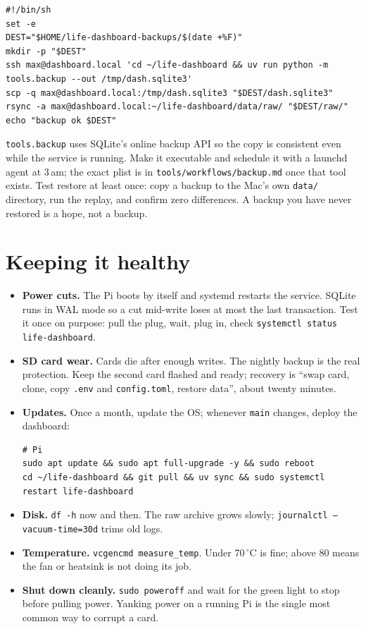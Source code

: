 \documentclass[11pt,letterpaper]{article}
\newcommand{\file}[1]{\texttt{#1}}
\newcommand{\cmd}[1]{\texttt{#1}}
\begin{document}
\begin{lstlisting}
#!/bin/sh
set -e
DEST="$HOME/life-dashboard-backups/$(date +%F)"
mkdir -p "$DEST"
ssh max@dashboard.local 'cd ~/life-dashboard && uv run python -m tools.backup --out /tmp/dash.sqlite3'
scp -q max@dashboard.local:/tmp/dash.sqlite3 "$DEST/dash.sqlite3"
rsync -a max@dashboard.local:~/life-dashboard/data/raw/ "$DEST/raw/"
echo "backup ok $DEST"
\end{lstlisting}

\cmd{tools.backup} uses SQLite's online backup API so the copy is consistent even while the service is running. Make it executable and schedule it with a launchd agent at 3\,am; the exact plist is in \file{tools/workflows/backup.md} once that tool exists. Test restore at least once: copy a backup to the Mac's own \file{data/} directory, run the replay, and confirm zero differences. A backup you have never restored is a hope, not a backup.

\section{Keeping it healthy}

\begin{itemize}
  \item \textbf{Power cuts.} The Pi boots by itself and systemd restarts the service. SQLite runs in WAL mode so a cut mid-write loses at most the last transaction. Test it once on purpose: pull the plug, wait, plug in, check \cmd{systemctl status life-dashboard}.
  \item \textbf{SD card wear.} Cards die after enough writes. The nightly backup is the real protection. Keep the second card flashed and ready; recovery is ``swap card, clone, copy \file{.env} and \file{config.toml}, restore data'', about twenty minutes.
  \item \textbf{Updates.} Once a month, update the OS; whenever \cmd{main} changes, deploy the dashboard:
\begin{lstlisting}
# Pi
sudo apt update && sudo apt full-upgrade -y && sudo reboot
cd ~/life-dashboard && git pull && uv sync && sudo systemctl restart life-dashboard
\end{lstlisting}
  \item \textbf{Disk.} \cmd{df -h} now and then. The raw archive grows slowly; \cmd{journalctl --vacuum-time=30d} trims old logs.
  \item \textbf{Temperature.} \cmd{vcgencmd measure\_temp}. Under 70\,$^\circ$C is fine; above 80 means the fan or heatsink is not doing its job.
  \item \textbf{Shut down cleanly.} \cmd{sudo poweroff} and wait for the green light to stop before pulling power. Yanking power on a running Pi is the single most common way to corrupt a card.
\end{itemize}
\end{document}
